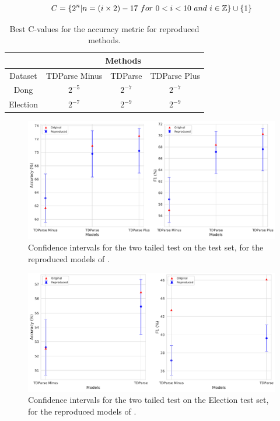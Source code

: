 \begin{equation}
    C=\{ 2^n | n = (i \times 2) - 17 ~for~0 < i < 10~and~i \in \mathbb{Z} \} \cup \{ 1 \} 
\label{eq:repro_wang_c_values}
\end{equation}

\FloatBarrier
\begin{table}[h!]
    \centering
    \begin{tabular}{|c|c|c|c|}
        \hline
         & \multicolumn{3}{c|}{Methods} \\
        \hline
        Dataset & TDParse Minus & TDParse & TDParse Plus \\
        \hline
        Dong & $2^{-5}$ & $2^{-7}$ & $2^{-7}$ \\
        \hline
        Election & $2^{-7}$ & $2^{-9}$ & $2^{-9}$ \\
        \hline
    \end{tabular}
    \caption{Best C-values for the accuracy metric for \citet{wang-etal-2017-tdparse} reproduced methods.}
    \label{table:repro_rep_wang_c}
\end{table}


\begin{figure}[!h]
    \centering
    \includegraphics[scale=0.37]{images/reproducibility/wang/TDParse_Dong.pdf}
    \caption{Confidence intervals for the two tailed test on the \citet{dong-etal-2014-adaptive} test set, for the reproduced models of \citet{wang-etal-2017-tdparse}.}
    \label{fig:repro_wang_TDParse_Dong}
\end{figure}
\begin{figure}[!h]
    \centering
    \includegraphics[scale=0.37]{images/reproducibility/wang/TDParse_Election.pdf}
    \caption{Confidence intervals for the two tailed test on the \citet{wang-etal-2017-tdparse} Election test set, for the reproduced models of \citet{wang-etal-2017-tdparse}.}
    \label{fig:repro_wang_TDParse_Election}
\end{figure}

